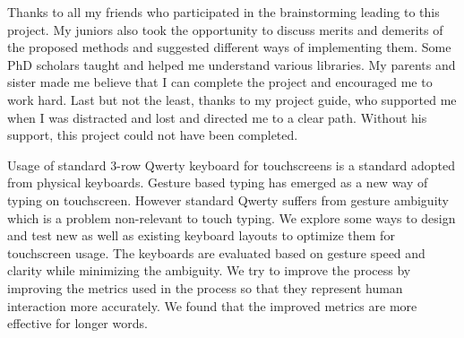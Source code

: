\documentclass[MTech]{iitmdiss}
\begin{document}
\acknowledgements

Thanks to all my friends who participated in the brainstorming leading to this project. My juniors also took the opportunity to discuss merits and demerits of the proposed methods and suggested different ways of implementing them. Some PhD scholars taught and helped me understand various libraries. My parents and sister made me believe that I can complete the project and encouraged me to work hard. Last but not the least, thanks to my project guide, who supported me when I was distracted and lost and directed me to a clear path. Without his support, this project could not have been completed.


\abstract
\noindent Usage of standard 3-row Qwerty keyboard for touchscreens is a standard adopted from physical keyboards. Gesture based typing has emerged as a new way of typing on touchscreen. However standard Qwerty suffers from gesture ambiguity which is a problem non-relevant to touch typing. We explore some ways to design and test new as well as existing keyboard layouts to optimize them for touchscreen usage. The keyboards are evaluated based on gesture speed and clarity while minimizing the ambiguity. We try to improve the process by improving the metrics used in the process so that they represent human interaction more accurately. We found that the improved metrics are more effective for longer words.

\pagebreak


\begin{singlespace}
\tableofcontents
\thispagestyle{empty}

\listoffigures
{}
\end{singlespace}



\end{document}
